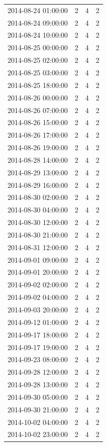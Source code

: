 \begin{tabular}{lrrr}
2014-08-24 01:00:00 & 2 & 4 & 2 \\
2014-08-24 09:00:00 & 2 & 4 & 2 \\
2014-08-24 10:00:00 & 2 & 4 & 2 \\
2014-08-25 00:00:00 & 2 & 4 & 2 \\
2014-08-25 02:00:00 & 2 & 4 & 2 \\
2014-08-25 03:00:00 & 2 & 4 & 2 \\
2014-08-25 18:00:00 & 2 & 4 & 2 \\
2014-08-26 00:00:00 & 2 & 4 & 2 \\
2014-08-26 07:00:00 & 2 & 4 & 2 \\
2014-08-26 15:00:00 & 2 & 4 & 2 \\
2014-08-26 17:00:00 & 2 & 4 & 2 \\
2014-08-26 19:00:00 & 2 & 4 & 2 \\
2014-08-28 14:00:00 & 2 & 4 & 2 \\
2014-08-29 13:00:00 & 2 & 4 & 2 \\
2014-08-29 16:00:00 & 2 & 4 & 2 \\
2014-08-30 02:00:00 & 2 & 4 & 2 \\
2014-08-30 04:00:00 & 2 & 4 & 2 \\
2014-08-30 12:00:00 & 2 & 4 & 2 \\
2014-08-30 21:00:00 & 2 & 4 & 2 \\
2014-08-31 12:00:00 & 2 & 4 & 2 \\
2014-09-01 09:00:00 & 2 & 4 & 2 \\
2014-09-01 20:00:00 & 2 & 4 & 2 \\
2014-09-02 02:00:00 & 2 & 4 & 2 \\
2014-09-02 04:00:00 & 2 & 4 & 2 \\
2014-09-03 20:00:00 & 2 & 4 & 2 \\
2014-09-12 01:00:00 & 2 & 4 & 2 \\
2014-09-17 18:00:00 & 2 & 4 & 2 \\
2014-09-17 19:00:00 & 2 & 4 & 2 \\
2014-09-23 08:00:00 & 2 & 4 & 2 \\
2014-09-28 12:00:00 & 2 & 4 & 2 \\
2014-09-28 13:00:00 & 2 & 4 & 2 \\
2014-09-30 05:00:00 & 2 & 4 & 2 \\
2014-09-30 21:00:00 & 2 & 4 & 2 \\
2014-10-02 04:00:00 & 2 & 4 & 2 \\
2014-10-02 23:00:00 & 2 & 4 & 2 \\

\end{tabular}
